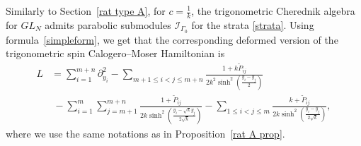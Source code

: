 \documentclass[12pt]{amsart}
\DeclareMathOperator{\Res}{Res}
\numberwithin{equation}{section}
\theoremstyle{definition}
\begin{document}
Similarly to Section~\ref{rat type A}, for $c = \frac{1}{k}$, the trigonometric Cherednik algebra for $GL_N$ admits parabolic submodules $\mathcal{I}_{\Gamma_0}$ for the strata \eqref{strata}.  
Using formula~\eqref{simpleform}, we get that the corresponding deformed version of the trigonometric spin Calogero--Moser Hamiltonian is
\begin{align*}
    L &= %
    \sum\limits_{i = 1}^{m+n} \partial_{y_i}^2  
    - \sum\limits_{m+1 \leq  i < j \leq m+n} \frac{1 + k\widetilde{P}_{ij}}{2k^2\sinh^2(\frac{y_i - y_j}{2})} \\
    &\ - \sum\limits_{i = 1}^m\sum\limits_{j = m+1}^{m+n}
     \frac{1 + \widetilde{P}_{ij}}{2k\sinh^2\left(\frac{y_i - \sqrt{k}y_j}{2\sqrt{k}}\right)}  -
    \sum\limits_{1 \leq i < j \leq m} \frac{k + \widetilde{P}_{ij}}{2k\sinh^2\left(\frac{y_i - y_j}{2\sqrt{k}}\right)},
\end{align*}
where we use the same notations as in Proposition~\ref{rat A prop}. 
\end{document}

